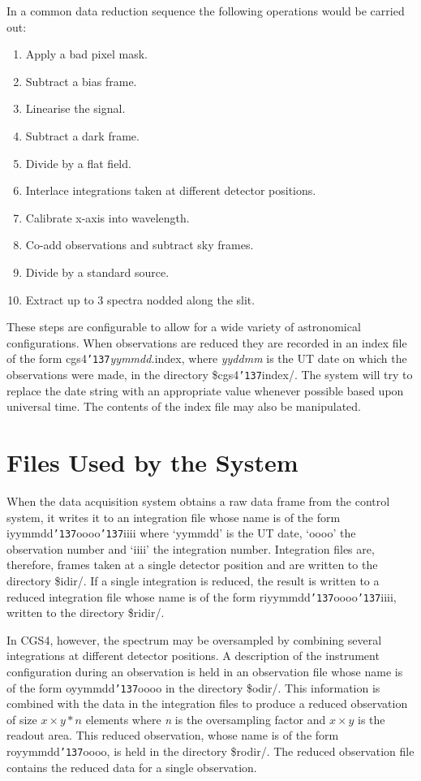 \documentclass[a4paper]{book}
\renewcommand{\_}{{\tt\char'137}}
\begin{document}
In a common data reduction sequence the following operations would be
carried out:

\begin{enumerate}
\item Apply a bad pixel mask.
\item Subtract a {\sc bias} frame.
\item Linearise the signal.
\item Subtract a {\sc dark} frame.
\item Divide by a {\sc flat} field.
\item Interlace integrations taken at different detector positions.
\item Calibrate x-axis into wavelength.
\item Co-add observations and subtract {\sc sky} frames.
\item Divide by a {\sc standard} source.
\item Extract up to 3 spectra nodded along the slit.
\end{enumerate}

These steps are configurable to allow for a wide variety of astronomical
configurations. When observations are reduced they are recorded in an
index file of the form {\sc cgs4\_}{\em yymmdd.}{\sc index}, where {\em
yyddmm} is the UT date on which the observations were made, in the
directory {\sc \$cgs4\_index/}. The system will try to replace the date
string with an appropriate value whenever possible based upon universal
time. The contents of the index file may also be manipulated.

\section{Files Used by the System}
When the data acquisition system obtains a raw data frame from the control
system, it writes it to an integration file whose name is of the form
iyymmdd\_oooo\_iiii where `yymmdd' is the UT date, `oooo' the observation
number and `iiii' the integration number. Integration files are,
therefore, frames taken at a single detector position and are written to
the directory {\sc \$idir/}. If a single integration is reduced, the
result is written to a reduced integration file whose name is of the form
riyymmdd\_oooo\_iiii, written to the directory {\sc \$ridir/}.

In CGS4, however, the spectrum may be oversampled by combining several
integrations at different detector positions. A description of the
instrument configuration during an observation is held in an observation
file whose name is of the form oyymmdd\_oooo in the directory {\sc
\$odir/}.  This information is combined with the data in the integration
files to produce a reduced observation of size $x \times y*n$ elements
where {\em n} is the oversampling factor and $x \times y$ is the readout
area.  This reduced observation, whose name is of the form royymmdd\_oooo,
is held in the directory {\sc \$rodir/}.  The reduced observation file
contains the reduced data for a single observation.
\end{document}
